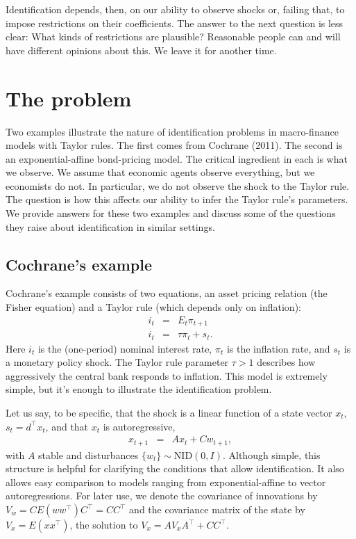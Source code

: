 \documentclass[12pt]{article}
\newcounter{tab}
\begin{document}
{Identification depends, then,
on our ability to observe shocks or, failing that, to impose restrictions
on their coefficients.
The answer to the next question is less clear:
What kinds of restrictions are plausible?
Reasonable people can and will have different opinions about this.
We leave it for another time.


\section{The problem}
\label{sec:examples}

Two examples illustrate the nature of identification problems in
macro-finance models with Taylor rules.
The first comes from Cochrane (2011).
The second is an exponential-affine bond-pricing model.
The critical ingredient in each is what we observe.
We assume that economic agents observe everything,
but we economists do not.
In particular, we do not observe the shock to the Taylor rule.
The question is how this affects our ability to
infer the Taylor rule's parameters.
We provide answers for these two examples and
discuss some of the questions they raise about identification
in similar settings.


\subsection{Cochrane's example}
\label{sec:example-cochrane}

Cochrane's example consists of two equations,
an asset pricing relation (the Fisher equation)
and a Taylor rule (which depends only on inflation):
\begin{eqnarray}
    i_t &=& E_t \pi_{t+1} %
        \label{eq:cochrane-euler} \\
    i_t &=& \tau \pi_t + s_{t} .
        \label{eq:cochrane-taylor}
\end{eqnarray}
Here $i_t$ is the (one-period) nominal interest rate,
$\pi_t$ is the inflation rate,
and $s_t$ is a monetary policy shock.
The Taylor rule parameter $\tau>1$ describes how aggressively
the central bank responds to inflation.
This model is extremely simple,
but it's enough to illustrate the identification problem.

Let us say, to be specific, that
the shock is a linear function of a state vector $x_t$,
$s_t = d^\top x_t$,
and that $x_t$ is autoregressive,
\begin{eqnarray}
    x_{t+1} &=&  A  x_t + C w_{t+1} ,
    \label{eq:state-dynamics}
\end{eqnarray}
with $ A $ stable and disturbances $\{ w_t \} \sim \mbox{NID}(0,I)$.
Although simple, this structure is helpful
for clarifying the conditions that allow identification.
It also allows easy comparison to models ranging
from exponential-affine to vector autoregressions.
For later use, we denote the covariance of innovations by
$ V_w = C E(w w^\top)C^\top = C C^\top $
and the covariance matrix of the state by $V_x= E(x x^\top)$,
the solution to $V_x = AV_x A^{\top} +CC^{\top}$.


}
\end{document}
